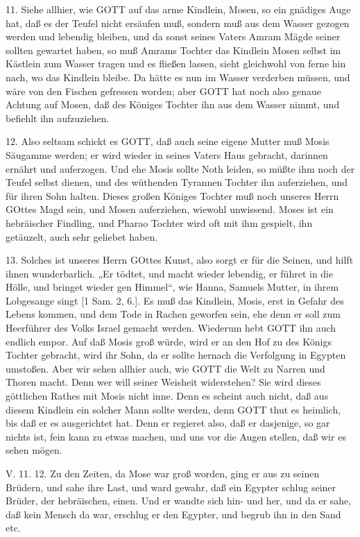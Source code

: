 11. Siehe allhier, wie GOTT auf das arme Kindlein, Mosen, so ein gnädiges Auge hat, daß es der Teufel nicht ersäufen muß, sondern muß aus dem Wasser gezogen werden und lebendig bleiben, und da sonst seines Vaters Amram Mägde seiner sollten gewartet haben, so muß Amrams Tochter das Kindlein Mosen selbst im Kästlein zum Wasser tragen und es fließen lassen, sieht gleichwohl von ferne hin nach, wo das Kindlein bleibe. Da hätte es nun im Wasser verderben müssen, und wäre von den Fischen gefressen worden; aber GOTT hat noch also genaue Achtung auf Mosen, daß des Königes Tochter ihn aus dem Wasser nimmt, und befiehlt ihn aufzuziehen.

12. Also seltsam schickt es GOTT, daß auch seine eigene Mutter muß Mosis Säugamme werden; er wird wieder in seines Vaters Haus gebracht, darinnen ernährt und auferzogen. Und ehe Mosis sollte Noth leiden, so müßte ihm noch der Teufel selbst dienen, und des wüthenden Tyrannen Tochter ihn auferziehen, und für ihren Sohn halten. Dieses großen Königes Tochter muß noch unseres Herrn GOttes Magd sein, und Mosen auferziehen, wiewohl unwissend. Moses ist ein hebräischer Findling, und Pharao Tochter wird oft mit ihm gespielt, ihn getäuzelt, auch sehr geliebet haben.

13. Solches ist unseres Herrn GOttes Kunst, also sorgt er für die Seinen, und hilft ihnen wunderbarlich. „Er tödtet, und macht wieder lebendig, er führet in die Hölle, und bringet wieder gen Himmel“, wie Hanna, Samuels Mutter, in ihrem Lobgesange singt [1 Sam. 2, 6.]. Es muß das Kindlein, Mosis, erst in Gefahr des Lebens kommen, und dem Tode in Rachen geworfen sein, ehe denn er soll zum Heerführer des Volks Israel gemacht werden. Wiederum hebt GOTT ihn auch endlich empor. Auf daß Mosis groß würde, wird er an den Hof zu des Königs Tochter gebracht, wird ihr Sohn, da er sollte hernach die Verfolgung in Egypten umstoßen. Aber wir sehen allhier auch, wie GOTT die Welt zu Narren und Thoren macht. Denn wer will seiner Weisheit widerstehen? Sie wird dieses göttlichen Rathes mit Mosis nicht inne. Denn es scheint auch nicht, daß aus diesem Kindlein ein solcher Mann sollte werden, denn GOTT thut es heimlich, bis daß er es ausgerichtet hat. Denn er regieret also, daß er dasjenige, so gar nichts ist, fein kann zu etwas machen, und uns vor die Augen stellen, daß wir es sehen mögen.

\begin{schriftzitat}
V. 11. 12. Zu den Zeiten, da Mose war groß worden, ging er aus zu seinen Brüdern, und sahe ihre Last, und ward gewahr, daß ein Egypter schlug seiner Brüder, der hebräischen, einen. Und er wandte sich hin- und her, und da er sahe, daß kein Mensch da war, erschlug er den Egypter, und begrub ihn in den Sand etc.
\end{schriftzitat}

